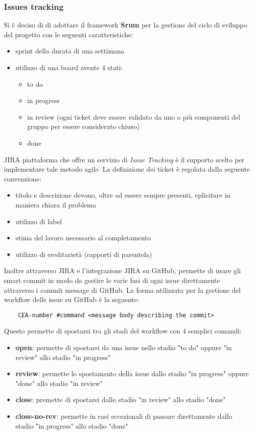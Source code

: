     \subsubsection{Issues tracking}
    Si è deciso di di adottare il framework \textbf{Srum} per la gestione del ciclo di sviluppo del progetto con le seguenti caratteristiche:
    \begin{itemize}
        \item sprint della durata di una settimana
        \item utilizzo di una board avente 4 stati:
            \begin{itemize}
                \item to do
                \item in progress
                \item in review (ogni ticket deve essere validato da uno o più componenti del gruppo per essere considerato chiuso)
                \item done
            \end{itemize}
    \end{itemize}
    JIRA piattaforma che offre un servizio di \textit{Issue Tracking} è il supporto scelto per implementare tale metodo agile.
    La definizione dei ticket è regolata dalla seguente convenzione:
    \begin{itemize}
        \item titolo e descrizione devono, oltre ad essere sempre presenti, eplicitare in maniera chiara il problema
        \item utilizzo di label
        \item stima del lavoro necessario al completamento
        \item utilizzo di ereditarietà (rapporti di parentela)
    \end{itemize}
    Inoltre attraverso JIRA e l'integrazione JIRA su GitHub, permette di usare gli smart commit in modo da gestire le varie fasi di ogni issue direttamente attraverso i commit message di GitHub.
    La forma utilizzata per la gestione del workflow delle issue su GitHub è la seguente:
    \begin{lstlisting}
    CEA-number #command <message body describing the commit>
    \end{lstlisting}
    Questo permette di spostarsi tra gli stadi del workflow con 4 semplici comandi:
\begin{itemize}
    \item \textbf{open}: permette di spostarsi da una issue nello stadio "to do" oppure "in review" allo stadio "in progress"
    \item \textbf{review}: permette lo spostamento della issue dallo stadio "in progress" oppure "done" allo stadio "in review"
    \item \textbf{close}: premette di spostarsi dallo stadio "in review" allo stadio "done"
    \item \textbf{close-no-rev}: permette in casi eccezionali di passare direttamente dallo stadio "in progress" allo stadio "done"
\end{itemize}

